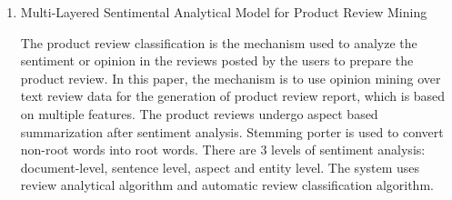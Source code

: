\documentclass[11pt]{report}
\begin{document}
\begin{enumerate}
    \item Multi-Layered Sentimental Analytical Model for Product Review Mining\cite{17}

    The product review classification is the mechanism used to analyze the sentiment or opinion in the reviews posted by the users to prepare the product review. In this paper, the mechanism is to use opinion mining over text review data for the generation of product review report, which is based on multiple features. The product reviews undergo aspect based summarization after sentiment analysis. Stemming porter is used to convert non-root words into root words. There are 3 levels of sentiment analysis: document-level, sentence level, aspect and entity level. The system uses review analytical algorithm and automatic review classification algorithm. \\        
    
\end{enumerate}
\end{document}
